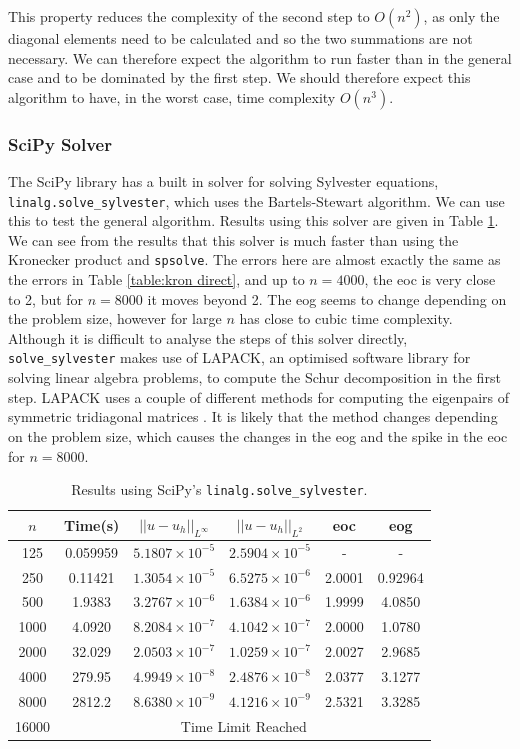 \documentclass[11pt]{article}
\numberwithin{equation}{section}
\begin{document}
This property reduces the complexity of the second step to $O(n^2)$, as only the diagonal elements need to be calculated and so the two summations are not necessary. We can therefore expect the algorithm to run faster than in the general case and to be dominated by the first step. We should therefore expect this algorithm to have, in the worst case, time complexity $O(n^3)$.

\subsubsection*{SciPy Solver}
The SciPy library has a built in solver for solving Sylvester equations, \texttt{linalg.solve\_sylvester}, which uses the Bartels-Stewart algorithm. We can use this to test the general algorithm. Results using this solver are given in Table \ref{table:bartels scipy}. We can see from the results that this solver is much faster than using the Kronecker product and \texttt{spsolve}. The errors here are almost exactly the same as the errors in Table \ref{table:kron direct}, and up to $n=4000$, the eoc is very close to 2, but for $n=8000$ it moves beyond 2. The eog seems to change depending on the problem size, however for large $n$ has close to cubic time complexity. Although it is difficult to analyse the steps of this solver directly, \texttt{solve\_sylvester} makes use of LAPACK, an optimised software library for solving linear algebra problems, to compute the Schur decomposition in the first step. LAPACK uses a couple of different methods for computing the eigenpairs of symmetric tridiagonal matrices \cite{Demmel}. It is likely that the method changes depending on the problem size, which causes the changes in the eog and the spike in the eoc for $n=8000$. 

\begin{table}[H]
\centering
\begin{tabular}{|c|c|c|c|c|c|}
\hline
$n$ & Time(s) & $|| u - u_h ||_{L^{\infty}}$ &$|| u - u_h ||_{L^{2}}$ & eoc & eog \\
\hline
125 & 0.059959 & $5.1807 \times 10^{-5}$ & $2.5904 \times 10^{-5}$ & - & - \\
250 & 0.11421 & $1.3054 \times 10^{-5}$ & $6.5275 \times 10^{-6}$ & 2.0001 & 0.92964 \\
500 & 1.9383 & $3.2767 \times 10^{-6}$ & $1.6384 \times 10^{-6}$ & 1.9999 & 4.0850  \\
1000 & 4.0920 & $8.2084 \times 10^{-7}$ & $4.1042 \times 10^{-7}$ & 2.0000 & 1.0780 \\
2000 & 32.029 & $2.0503 \times 10^{-7}$ & $1.0259 \times 10^{-7}$ & 2.0027 & 2.9685  \\
4000 & 279.95 & $4.9949 \times 10^{-8}$ & $2.4876 \times 10^{-8}$ & 2.0377 & 3.1277  \\
8000 & 2812.2 & $8.6380 \times 10^{-9}$ & $4.1216 \times 10^{-9}$ & 2.5321 & 3.3285 \\
\cline{2-6}
16000 & \multicolumn{5}{c|}{Time Limit Reached} \\
\hline
\end{tabular}
\caption{Results using SciPy's \texttt{linalg.solve\_sylvester}.}
\label{table:bartels scipy}
\end{table}
\end{document}
